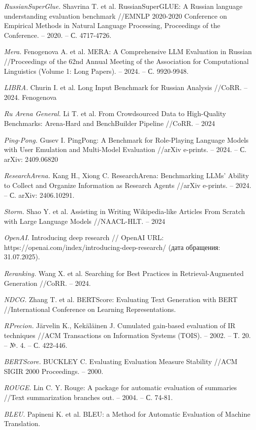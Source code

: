 \documentclass{article}
\theoremstyle{definition}
\theoremstyle{plain}
\begin{document}
\begin{thebibliography}{99}

\textit{RussianSuperGlue.}
Shavrina T. et al. RussianSuperGLUE: A Russian language understanding evaluation benchmark //EMNLP 2020-2020 Conference on Empirical Methods in Natural Language Processing, Proceedings of the Conference. – 2020. – С. 4717-4726.

\textit{Mera.}
Fenogenova A. et al. MERA: A Comprehensive LLM Evaluation in Russian //Proceedings of the 62nd Annual Meeting of the Association for Computational Linguistics (Volume 1: Long Papers). – 2024. – С. 9920-9948.

\textit{LIBRA.}
Churin I. et al. Long Input Benchmark for Russian Analysis //CoRR. – 2024. Fenogenova 

\textit{Ru Arena General.}
Li T. et al. From Crowdsourced Data to High-Quality Benchmarks: Arena-Hard and BenchBuilder Pipeline //CoRR. – 2024

\textit{Ping-Pong.}
Gusev I. PingPong: A Benchmark for Role-Playing Language Models with User Emulation and Multi-Model Evaluation //arXiv e-prints. – 2024. – С. arXiv: 2409.06820

\textit{ResearchArena.}
Kang H., Xiong C. ResearchArena: Benchmarking LLMs' Ability to Collect and Organize Information as Research Agents //arXiv e-prints. – 2024. – С. arXiv: 2406.10291.

\textit{Storm.}
Shao Y. et al. Assisting in Writing Wikipedia-like Articles From Scratch with Large Language Models //NAACL-HLT. – 2024

\textit{OpenAI.}
Introducing deep research // OpenAI URL: https://openai.com/index/introducing-deep-research/ (дата обращения: 31.07.2025).

\textit{Reranking.}
Wang X. et al. Searching for Best Practices in Retrieval-Augmented Generation //CoRR. – 2024.

\textit{NDCG.}
Zhang T. et al. BERTScore: Evaluating Text Generation with BERT //International Conference on Learning Representations.

\textit{RPrecion.}
Järvelin K., Kekäläinen J. Cumulated gain-based evaluation of IR techniques //ACM Transactions on Information Systems (TOIS). – 2002. – Т. 20. – №. 4. – С. 422-446.

\textit{BERTScore.}
BUCKLEY C. Evaluating Evaluation Measure Stability //ACM SIGIR 2000 Proceedings. – 2000.

\textit{ROUGE.}
Lin C. Y. Rouge: A package for automatic evaluation of summaries //Text summarization branches out. – 2004. – С. 74-81.

\textit{BLEU.}
Papineni K. et al. BLEU: a Method for Automatic Evaluation of Machine Translation.

\end{thebibliography}
\end{document}
